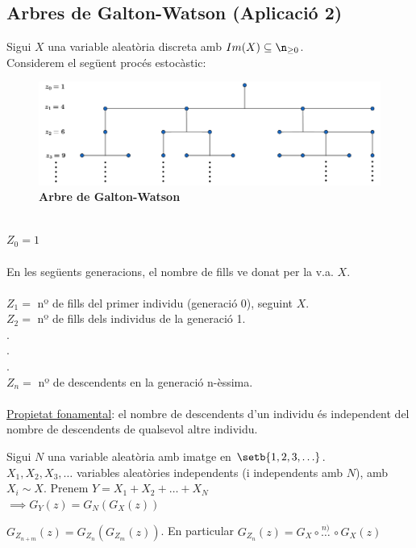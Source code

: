 \subsection{Arbres de Galton-Watson (Aplicació 2)}
Sigui $X$ una variable aleatòria discreta amb $Im(X)\subseteq \n_{\geq 0}$. \\
Considerem el següent procés estocàstic: \\
\begin{figure}[h]
\includegraphics[scale=0.45]{G-WTree.png}
\caption*{\textbf{Arbre de Galton-Watson}}
\centering
\end{figure}
\\
$Z_{0} = 1$\\\\
En les següents generacions, el nombre de fills ve donat per la v.a. $X$.\\\\
$Z_{1} =$ nº de fills del primer individu (generació 0), seguint $X$.\\
$Z_{2} =$ nº de fills dels individus de la generació 1.\\
.\\
.\\
.\\
$Z_{n} =$ nº de descendents en la generació n-èssima.\\\\

\underline{Propietat fonamental}: el nombre de descendents d'un individu és independent del nombre de descendents de qualsevol altre individu. \\

\begin{lema}
  Sigui $N$ una variable aleatòria amb imatge en $\setb{1,2,3,\ldots}$.\\
  $X_{1},X_{2},X_{3},\ldots$ variables aleatòries independents (i independents amb $N$), amb $X_{i}\sim X$. Prenem $Y=X_{1}+X_{2}+\ldots +X_{N}$\\
  $\implies G_{Y}(z)=G_{N}(G_{X}(z))$
\end{lema}

\begin{prop}
  $G_{Z_{n+m}}(z) = G_{Z_{n}}(G_{Z_{m}}(z))$. En particular $G_{Z_{n}}(z)=G_{X}\circ \overset{n)}{\ldots} \, \circ G_{X}(z)$
\end{prop}

